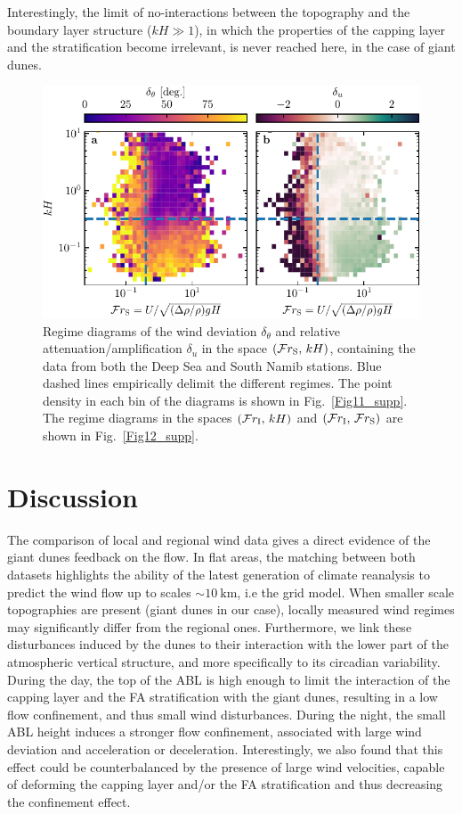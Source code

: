   Interestingly, the limit of no-interactions between the topography and the boundary layer structure ($k H \gg 1$), in which the properties of the capping layer and the stratification become irrelevant, is never reached here, in the case of giant dunes.

  \begin{figure}
    \centering
    \includegraphics[scale=1]{Figures/Figure5.pdf}
    \caption{Regime diagrams of the wind deviation $\delta_{\theta}$ and relative attenuation/amplification $\delta_{u}$ in the space $(\mathcal{F}r_{\textup{S}}, \, kH)$, containing the data from both the Deep Sea and South Namib stations. Blue dashed lines empirically delimit the different regimes. The point density in each bin of the diagrams is shown in Fig.~\ref{Fig11_supp}. The regime diagrams in the spaces $(\mathcal{F}r_{\textup{I}}, \, kH)$ and $(\mathcal{F}r_{\textup{I}}, \, \mathcal{F}r_{\textup{S}})$ are shown in Fig.~\ref{Fig12_supp}.}
    \label{Fig5}
  \end{figure}

\section{Discussion}

 The comparison of local and regional wind data gives a direct evidence of the giant dunes feedback on the flow. In flat areas, the matching between both datasets highlights the ability of the latest generation of climate reanalysis to predict the wind flow up to scales $\sim 10~\textrm{km}$, i.e the grid model. When smaller scale topographies are present (giant dunes in our case), locally measured wind regimes may significantly differ from the regional ones. Furthermore, we link these disturbances induced by the dunes to their interaction with the lower part of the atmospheric vertical structure, and more specifically to its circadian variability. During the day, the top of the ABL is high enough to limit the interaction of the capping layer and the FA stratification with the giant dunes, resulting in a low flow confinement, and thus small wind disturbances. During the night, the small ABL height induces a stronger flow confinement, associated with large wind deviation and acceleration or deceleration. Interestingly, we also found that this effect could be counterbalanced by the presence of large wind velocities, capable of deforming the capping layer and/or the FA stratification and thus decreasing the confinement effect.


